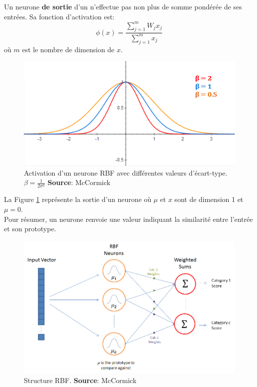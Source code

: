 Un neurone \textbf{de sortie} d'un \rbf n'effectue pas non plus de somme pondérée de ses entrées. Sa fonction d'activation est:
\begin{equation}\label{eq:sortiephi}
 \phi(x) = \frac{\sum_{j=1}^{m}W_{j}x_{j}}{\sum_{j=1}^{m}x_{j}}
\end{equation}
où $m$ est le nombre de dimension de $x$.
\begin{figure}
 \centering
 \includegraphics[scale=0.7]{../figures/RBFactivation.png}%
 \caption{Activation d'un neurone RBF avec différentes valeurs d'écart-type. $\beta=\frac{1}{2\sigma^2}$ \textbf{Source}: McCormick\cite{RBFtuto}}
 \label{rbfactivation}
\end{figure}
La Figure \ref{rbfactivation} représente la sortie d'un neurone \rbf où $\mu$ et $x$ sont de dimension 1 et $\mu = 0$.\\
Pour résumer, un neurone \rbf renvoie une valeur indiquant la similarité entre l'entrée et son prototype.
\begin{figure}
 \centering
 \includegraphics[scale=0.5]{../figures/RBFstruct.png}
 \caption{Structure RBF. \textbf{Source}: McCormick\cite{RBFtuto}}
 \label{structurerbf}
\end{figure}
